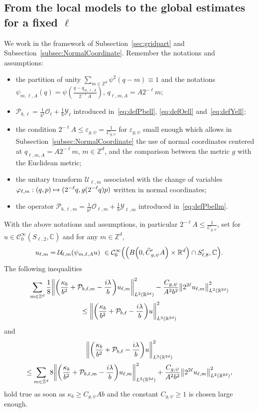 \documentclass[10pt]{amsart}
\theoremstyle{definition}\newtheorem{defi}[theo]{Definition}\newtheorem{rema}[theo]{Remark}\newtheorem{exam}[theo]{Example}\newtheorem{exem}[theo]{Example}\newtheorem{nota}[theo]{Notation}
\newcommand{\C}{\mathbb{C}}
\newcommand{\Z}{\mathbb{Z}}
\newcommand{\R}{\mathbb{R}}
\newcommand{\clC}{\mathcal{C}}
\newcommand{\clY}{\mathcal{Y}}
\newcommand{\clO}{\mathcal{O}}
\newcommand{\clP}{\mathcal{P}}
\newcommand{\clU}{\mathcal{U}}
\newcommand\norm[1]{\left\lVert#1\right\rVert}
\let\oldhat\hat
\renewcommand*{\hat}[1]{\mathchoice{\widehat{#1}}{\widehat{#1}}{\oldhat{#1}}{\oldhat{#1}}}
\let\originalleft\left
\let\originalright\right
\renewcommand{\left}{\mathopen{}\mathclose\bgroup\originalleft}
\renewcommand{\right}{\aftergroup\egroup\originalright}
\let\oldmapsto\mapsto
\renewcommand*{\mapsto}{\mathchoice{\longmapsto}{\oldmapsto}{\oldmapsto}{\oldmapsto}}
\begin{document}
\subsection{From the local models to the global estimates for a fixed \texorpdfstring{$\ell$}{l}}\label{sec:locglobfixedell}
We work in the framework of Subsection~\ref{sec:gridpart} and Subsection~\ref{subsec:NormalCoordinate}. Remember the notations and assumptions:
\begin{itemize}
\item the partition of unity $\sum_{m\in\Z^d}\psi^2(q-m)\equiv 1$ and the notations $\psi_{m,\ell,A}(q)=\psi(\frac{q-q_{m,\ell,A}}{2^{-\ell}A})$, $q_{\ell,m,A}=A2^{-\ell}m$;
\item $\clP_{b,\ell}=\frac{1}{b^2}\clO_{\ell}+\frac{1}{b}\clY_{\ell}$ introduced in~\eqref{eq:defPbell}, \eqref{eq:defOell} and~\eqref{eq:defYell};
\item the condition $2^{-\ell}A\leq \varepsilon_{g,\psi}=\frac{1}{C_{g,\psi}}$ for $\varepsilon_{g,\psi}$ small enough which allows in Subsection~\ref{subsec:NormalCoordinate} the use of normal coordinates centered at $q_{\ell,m,A}=A2^{-\ell}m$, $m\in\Z^d$, and the comparison between the metric $g$ with the Euclidean metric;
\item the unitary transform $\clU_{\ell,m}$ associated with the change of variables $ \varphi_{\ell,m} : (q,p) \mapsto
(2^{-\ell}q,g(2^{-\ell}q)p)$ written in normal coordinates;
\item the operator $\clP_{b,\ell,m}=\frac{1}{b^2}\clO_{\ell,m}+\frac{1}{b}\clY_{\ell,m}$ introduced in~\eqref{eq:defPbellm}.
\end{itemize}
\begin{prop}\label{pr:locglobPbell}
With the above notations and assumptions, in particular $2^{-\ell}A\leq \frac{1}{C_{g,\psi}}$, set for $u\in\clC^{\infty}_{0}(S_{\ell,2},\C)$ and for any $m\in \Z^d$,
\[
u_{\ell,m}=\clU_{\ell,m}(\psi_{m,\ell,A}u)~\in \clC^\infty_0\left(\left(B\left(0,\hat{C}'_{g,\psi}A\right)\times \R^d\right)\cap S_{\ell,8}',\C\right).
\]
The following inequalities
\begin{multline*}
\sum_{m\in \Z^d}\frac{1}{8}\left\| \left(\frac{\kappa_{b}}{b^{2}}+\clP_{b,\ell,m} - \frac{i\lambda}{b}\right) u_{\ell,m}\right\|^{2}_{L^2(\R^{2d})}-\frac{C_{g,\psi}}{A^2b^2}\norm{2^{2\ell}u_{\ell,m}}_{L^2(\R^{2d})}^2
\\
\leq
\left\| \left(\frac{\kappa_{b}}{b^{2}}+\clP_{b,\ell} - \frac{i\lambda}{b}\right) u \right\|^{2}_{L^2(\R^{2d})}
\end{multline*}
and
\begin{multline*}
\left\|\left(\frac{\kappa_{b}}{b^{2}}+\clP_{b,\ell} - \frac{i\lambda}{b}\right) u \right\|^{2}_{L^2(\R^{2d})}
\\
\leq \sum_{m\in \Z^d}8\left\| \left(\frac{\kappa_{b}}{b^{2}}+\clP_{b,\ell,m} - \frac{i\lambda}{b}\right) u_{\ell,m}\right\|^{2}_{L^2(\R^{2d})} +\frac{C_{g,\psi}}{A^2b^2}\norm{2^{2\ell}u_{\ell,m}}_{L^2(\R^{2d})}^2,
\end{multline*}
hold true as soon as $\kappa_b\geq C_{g,\psi}Ab$ and the constant $C_{g,\psi}\geq 1$ is chosen large enough.
\end{prop}
\end{document}
